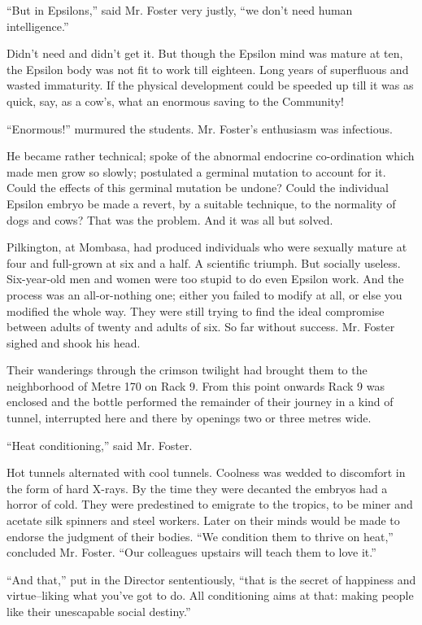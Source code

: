 \documentclass[12pt]{report}
\begin{document}
``But in Epsilons,'' said Mr. Foster very justly, ``we don't need human
intelligence.''

Didn't need and didn't get it. But though the Epsilon mind was mature at
ten, the Epsilon body was not fit to work till eighteen. Long years of
superfluous and wasted immaturity. If the physical development could be
speeded up till it was as quick, say, as a cow's, what an enormous
saving to the Community!

``Enormous!'' murmured the students. Mr. Foster's enthusiasm was
infectious.

He became rather technical; spoke of the abnormal endocrine
co-ordination which made men grow so slowly; postulated a germinal
mutation to account for it. Could the effects of this germinal mutation
be undone? Could the individual Epsilon embryo be made a revert, by a
suitable technique, to the normality of dogs and cows? That was the
problem. And it was all but solved.

Pilkington, at Mombasa, had produced individuals who were sexually
mature at four and full-grown at six and a half. A scientific triumph.
But socially useless. Six-year-old men and women were too stupid to do
even Epsilon work. And the process was an all-or-nothing one; either you
failed to modify at all, or else you modified the whole way. They were
still trying to find the ideal compromise between adults of twenty and
adults of six. So far without success. Mr. Foster sighed and shook his
head.

Their wanderings through the crimson twilight had brought them to the
neighborhood of Metre 170 on Rack 9. From this point onwards Rack 9 was
enclosed and the bottle performed the remainder of their journey in a
kind of tunnel, interrupted here and there by openings two or three
metres wide.

``Heat conditioning,'' said Mr. Foster.

Hot tunnels alternated with cool tunnels. Coolness was wedded to
discomfort in the form of hard X-rays. By the time they were decanted
the embryos had a horror of cold. They were predestined to emigrate to
the tropics, to be miner and acetate silk spinners and steel workers.
Later on their minds would be made to endorse the judgment of their
bodies. ``We condition them to thrive on heat,'' concluded Mr. Foster.
``Our colleagues upstairs will teach them to love it.''

``And that,'' put in the Director sententiously, ``that is the secret of
happiness and virtue--liking what you've got to do. All conditioning
aims at that: making people like their unescapable social destiny.''
\end{document}
